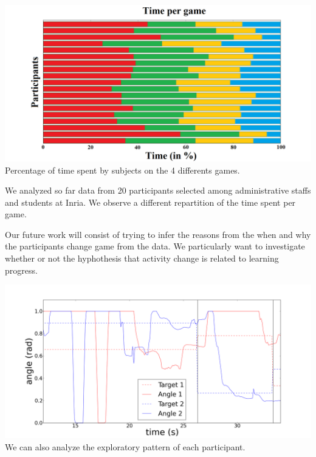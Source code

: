 \documentclass[a0,final, portrait]{inriaposter}
\begin{document}
\begin{multicols}{2}
{\vspace{3cm}


\begin{center}
    \includegraphics[width=1.0\columnwidth]{images/temps_jeux.png}\\
    {\large Percentage of time spent by subjects on the 4 differents games.}
\end{center}

\vspace{3cm}


We analyzed so far data from 20 participants selected among administrative staffs and students at Inria. We observe a different repartition of the time spent per game.

Our future work will consist of trying to infer the reasons from the when and why the participants change game from the data. We particularly want to investigate whether or not the hyphothesis that activity change is related to learning progress.

\begin{center}
    \includegraphics[width=1.0\columnwidth]{images/xp2.png}\\
    {\large We can also analyze the exploratory pattern of each participant.}
\end{center}

\vspace{3cm}

}

{
	\nocite{*}
	
	\renewcommand{\section}[2]{}%
	
	\vspace{-10pt}
}

\end{multicols}
\vfill
\end{document}
